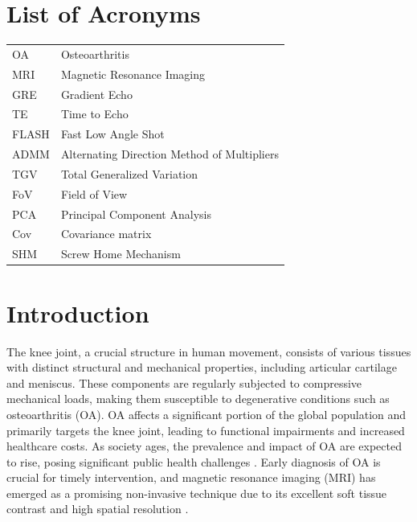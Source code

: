 \documentclass{micro-econ-thesis}
\begin{document}
\section*{List of Acronyms}
\begin{tabular}{@{}ll}
OA & Osteoarthritis\\
MRI & Magnetic Resonance Imaging \\
GRE & Gradient Echo \\
TE & Time to Echo \\
FLASH & Fast Low Angle Shot \\
ADMM & Alternating Direction Method of Multipliers \\
TGV & Total Generalized Variation \\
FoV & Field of View \\
PCA & Principal Component Analysis \\
Cov & Covariance matrix \\ 
SHM & Screw Home Mechanism

\end{tabular}


\cleardoublepage
\pagestyle{headings}
\setcounter{page}{1}
\onehalfspacing %

\section{Introduction}

The knee joint, a crucial structure in human movement, consists of various tissues with distinct structural and mechanical properties, including articular cartilage and meniscus. These components are regularly subjected to compressive mechanical loads, making them susceptible to degenerative conditions such as osteoarthritis (OA). OA affects a significant portion of the global population and primarily targets the knee joint, leading to functional impairments and increased healthcare costs. As society ages, the prevalence and impact of OA are expected to rise, posing significant public health challenges \parencite{yelin_burden_2016}. Early diagnosis of OA is crucial for timely intervention, and magnetic resonance imaging (MRI) has emerged as a promising non-invasive technique due to its excellent soft tissue contrast and high spatial resolution \parencite{kijowski_osteoarthritis_2020} . 
\end{document}
